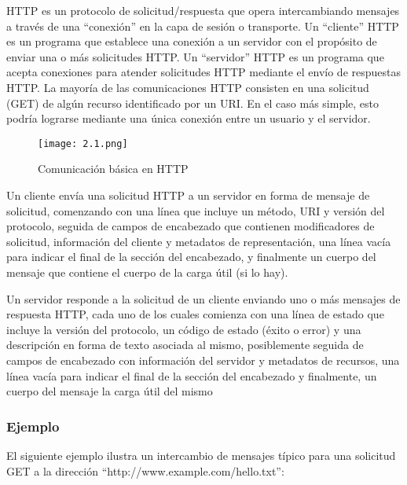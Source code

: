HTTP es un protocolo de solicitud/respuesta que opera intercambiando 
mensajes a través de una ``conexión'' en la capa de sesión o transporte.
 Un “cliente” HTTP es un programa que establece una conexión a un 
 servidor con el propósito de enviar una o más solicitudes HTTP. 
 Un “servidor” HTTP es un programa que acepta conexiones para
  atender solicitudes HTTP mediante el envío de respuestas HTTP. 
  La mayoría de las comunicaciones HTTP consisten en una solicitud
   (GET) de algún recurso identificado por un URI. En el caso más 
   simple, esto podría lograrse mediante una única conexión entre un
    usuario y el servidor.

\begin{center}
   \begin{figure}   
      \begin{center}
         \texttt{[image: 2.1.png]}
      \end{center}
      \caption{Comunicación básica en HTTP}
   \end{figure}
\end{center}

Un cliente envía una solicitud HTTP a un servidor en forma de mensaje
 de solicitud, comenzando con una línea que incluye un método, URI y 
 versión del protocolo, seguida de campos de encabezado que contienen
  modificadores de solicitud, información del cliente y metadatos de
   representación, una línea vacía para indicar el final de la sección
    del encabezado, y finalmente un cuerpo del mensaje que contiene el 
    cuerpo de la carga útil (si lo hay). 
    
    Un servidor responde a la 
    solicitud de un cliente enviando uno o más mensajes de respuesta 
    HTTP, cada uno de los cuales comienza con una línea de estado que 
    incluye la versión del protocolo, un código de estado (éxito o error)
     y una descripción en forma de texto asociada al mismo, posiblemente 
     seguida de campos de encabezado con información del servidor y
      metadatos de recursos, una línea vacía para indicar el final 
      de la sección del encabezado y finalmente, un cuerpo del mensaje
       la carga útil del mismo

\subsubsection*{Ejemplo}
El siguiente ejemplo ilustra un intercambio de mensajes típico 
para una solicitud GET a la dirección “http://www.example.com/hello.txt”:

